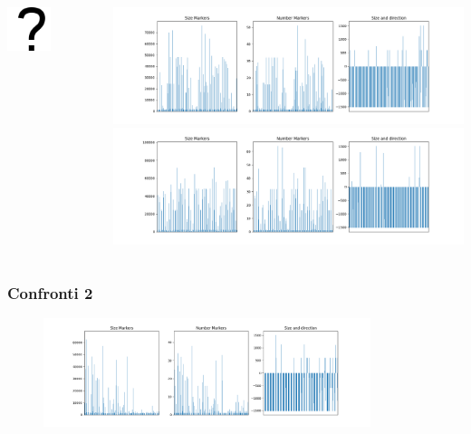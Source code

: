 \documentclass{beamer}[10pt]
\begin{document}
\begin{frame}
\begin{columns}[T]
\begin{column}{0.33\textwidth}
\begin{center}
        \includegraphics[width=0.5\textwidth]{../img/questionMark.png}
      \end{center}
    \end{column}
    \begin{column}{0.33\textwidth}
      \begin{center}
        \includegraphics[width=\textwidth]{../img/unical-figure.png}
        \includegraphics[width=\textwidth]{../img/youtube-figure.png}
      \end{center}
    \end{column}
  \end{columns}
\end{frame}

\begin{frame}
  \frametitle{Confronti 2}
  \begin{figure}
    \centering
    \includegraphics[width=0.851\textwidth]{../img/random-figure.png}
  \end{figure}
\end{frame}
\end{document}
